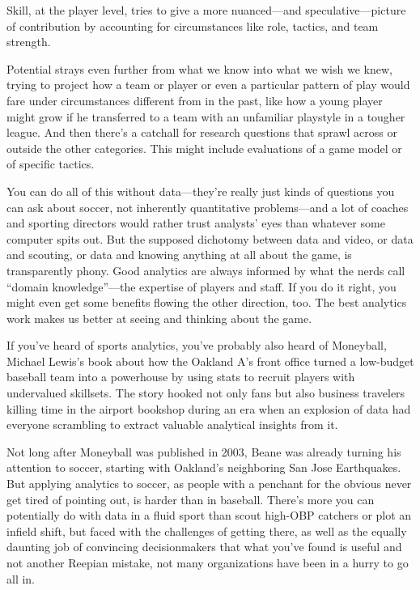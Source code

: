 Skill, at the player level, tries to give a more nuanced—and 
speculative—picture of contribution by accounting for circumstances 
like role, tactics, and team strength. 

Potential strays even further from what we know into what we wish we 
knew, trying to project how a team or player or even a particular 
pattern of play would fare under circumstances different from in the 
past, like how a young player might grow if he transferred to a team 
with an unfamiliar playstyle in a tougher league. And then there’s 
a catchall for research questions that sprawl across or outside 
the other categories. This might include evaluations of a game 
model or of specific tactics.

You can do all of this without data—they’re really just kinds 
of questions you can ask about soccer, not inherently quantitative 
problems—and a lot of coaches and sporting directors would rather 
trust analysts’ eyes than whatever some computer spits out. But 
the supposed dichotomy between data and video, or data and scouting, 
or data and knowing anything at all about the game, is transparently 
phony. Good analytics are always informed by what the nerds call 
“domain knowledge”—the expertise of players and staff. If you do it 
right, you might even get some benefits flowing the other direction, too. 
The best analytics work makes us better at seeing and thinking about the game.

If you’ve heard of sports analytics, you’ve probably also heard of Moneyball, 
Michael Lewis’s book about how the Oakland A’s front office turned a 
low-budget baseball team into a powerhouse by using stats to recruit 
players with undervalued skillsets. The story hooked not only fans 
but also business travelers killing time in the airport bookshop 
during an era when an explosion of data had everyone scrambling to 
extract valuable analytical insights from it.

Not long after Moneyball was published in 2003, Beane was already turning 
his attention to soccer, starting with Oakland’s neighboring San Jose 
Earthquakes. But applying analytics to soccer, as people with a penchant 
for the obvious never get tired of pointing out, is harder than in baseball. 
There’s more you can potentially do with data in a fluid sport than scout 
high-OBP catchers or plot an infield shift, but faced with the challenges 
of getting there, as well as the equally daunting job of convincing 
decisionmakers that what you’ve found is useful and not another 
Reepian mistake, not many organizations have been in a hurry to go all in.

